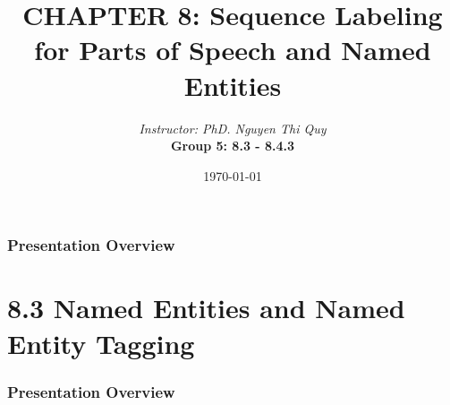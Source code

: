 \documentclass[13.5pt,aspecratio=169]{beamer}
\title{CHAPTER 8: Sequence Labeling for Parts of
Speech and Named Entities}
\author[Group 5]{\textit{Instructor: PhD. Nguyen Thi Quy}\\ \bigskip \textbf{Group 5: 8.3 - 8.4.3}}
\date{\today}
\begin{document}
\maketitle



\begin{frame}
    \doublespacing
        \frametitle{Presentation Overview} %
        
        \tableofcontents %
\end{frame}
    
    
    \section{8.3 Named Entities and Named Entity Tagging} %
    \begin{frame}
        \doublespacing
            \frametitle{Presentation Overview} %
            
            \tableofcontents[currentsection] %
    \end{frame}

\end{document}
